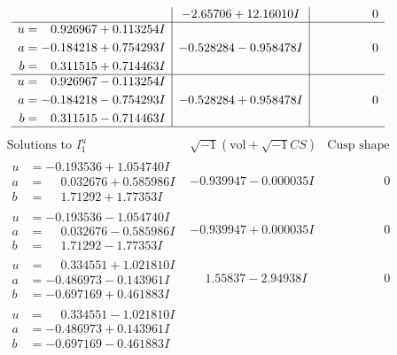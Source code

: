 \documentclass[1p]{elsarticle_modified}
\theoremstyle{definition}
\newcommand{\I}{\sqrt{-1}}
\begin{document}
$$\begin{array}{c|c|c}
 & -2.65706 + 12.16010 I & \phantom{-0.000000 } 0 \\ \hline\begin{aligned}
u &= \phantom{-}0.926967 + 0.113254 I \\
a &= -0.184218 + 0.754293 I \\
b &= \phantom{-}0.311515 + 0.714463 I\end{aligned}
 & -0.528284 - 0.958478 I & \phantom{-0.000000 } 0 \\ \hline\begin{aligned}
u &= \phantom{-}0.926967 - 0.113254 I \\
a &= -0.184218 - 0.754293 I \\
b &= \phantom{-}0.311515 - 0.714463 I\end{aligned}
 & -0.528284 + 0.958478 I & \phantom{-0.000000 } 0\\
 \hline 
 \end{array}$$\newpage$$\begin{array}{c|c|c}  
\text{Solutions to }I^u_{1}& \I (\text{vol} + \sqrt{-1}CS) & \text{Cusp shape}\\
 \hline 
\begin{aligned}
u &= -0.193536 + 1.054740 I \\
a &= \phantom{-}0.032676 + 0.585986 I \\
b &= \phantom{-}1.71292 + 1.77353 I\end{aligned}
 & -0.939947 - 0.000035 I & \phantom{-0.000000 } 0 \\ \hline\begin{aligned}
u &= -0.193536 - 1.054740 I \\
a &= \phantom{-}0.032676 - 0.585986 I \\
b &= \phantom{-}1.71292 - 1.77353 I\end{aligned}
 & -0.939947 + 0.000035 I & \phantom{-0.000000 } 0 \\ \hline\begin{aligned}
u &= \phantom{-}0.334551 + 1.021810 I \\
a &= -0.486973 - 0.143961 I \\
b &= -0.697169 + 0.461883 I\end{aligned}
 & \phantom{-}1.55837 - 2.94938 I & \phantom{-0.000000 } 0 \\ \hline\begin{aligned}
u &= \phantom{-}0.334551 - 1.021810 I \\
a &= -0.486973 + 0.143961 I \\
b &= -0.697169 - 0.461883 I\end{aligned}

\end{array}$$
\end{document}
